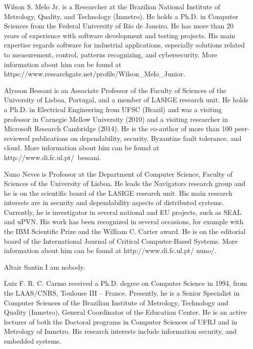 \documentclass[journal]{IEEEtran}
\begin{document}

\begin{IEEEbiographynophoto}{Wilson S. Melo Jr.}
is a Researcher at the Brazilian National Institute of Metrology, Quality, and Technology (Inmetro).
He holds a Ph.D. in Computer Sciences from the Federal University of Rio de Janeiro.
He has more than 20 years of experience with software development and testing projects.
His main expertise regards software for industrial applications, especially solutions related to measurement, control, patterns recognizing, and cybersecurity.
More information about him can be found at https://www.researchgate.net/profile/Wilson\_Melo\_Junior.
\end{IEEEbiographynophoto}

\begin{IEEEbiographynophoto}{Alysson Bessani}
 is an Associate Professor of the Faculty of Sciences of the University of Lisboa, Portugal, and a member of LASIGE research unit. He holds a Ph.D. in Electrical Engineering from UFSC (Brazil) and was a visiting professor in Carnegie Mellow University (2010) and a visiting researcher in Microsoft Research Cambridge (2014). He is the co-author of more than 100 peer-reviewed publications on dependability, security, Byzantine fault tolerance, and cloud. More information about him can be found at http://www.di.fc.ul.pt/~bessani.
\end{IEEEbiographynophoto}

\begin{IEEEbiographynophoto}{Nuno Neves}
is Professor at the Department of Computer Science, Faculty of Sciences of the University of Lisboa. He leads the Navigators research group and he is on the scientific board of the LASIGE research unit. His main research interests are in security and dependability aspects of distributed systems. Currently, he is investigator in several national and EU projects, such as SEAL and uPVN. His work has been recognized in several occasions, for example with the IBM Scientific Prize and the William C. Carter award. He is on the editorial board of the International Journal of Critical Computer-Based Systems. More information about him can be found at http://www.di.fc.ul.pt/ nuno/.
\end{IEEEbiographynophoto}

\begin{IEEEbiographynophoto}{Altair Santin}
I am nobody.
\end{IEEEbiographynophoto}

\begin{IEEEbiographynophoto}{Luiz F. R. C. Carmo}
received a Ph.D. degree on Computer Science in 1994, from the LAAS/CNRS, Toulouse III – France.
Presently, he is a Senior Specialist in Computer Sciences of the Brazilian Institute of Metrology, Technology and Quality (Inmetro), General Coordinator of the Education Center. 
He is an active lecturer of both the Doctoral programs in Computer Sciences of UFRJ and in Metrology of Inmetro.
His research interests include information security, and embedded systems.
\end{IEEEbiographynophoto}
\end{document}
